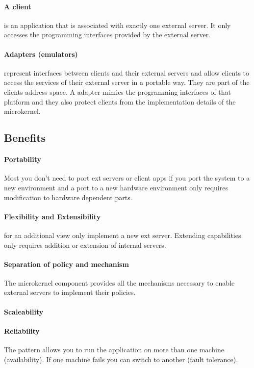 \documentclass[a4paper,11pt,twocolumn]{report}
\begin{document}
    \paragraph{A client} is an application that is associated with exactly one
    external server. It only accesses the programming interfaces provided by
    the external server.
    \paragraph{Adapters (emulators)} represent interfaces between clients and
    their external servers and allow clients to access the services of their
    external server in a portable way. They are part of the clients address
    space. A adapter mimics the programming interfaces of that platform and
    they also protect clients from the implementation details of the
    microkernel.
    \subsection{Benefits}
    \paragraph{Portability} Most you don't need to port ext servers or client
    apps if you port the system to a new environment and a port to a new
    hardware environment only requires modification to hardware dependent
    parts.
    \paragraph{Flexibility and Extensibility} for an additional view only
    implement a new ext server. Extending capabilities only requires addition
    or extension of internal servers.
    \paragraph{Separation of policy and mechanism} The microkernel component
    provides all the mechanisms necessary to enable external servers to
    implement their policies.
    \paragraph{Scaleability}
    \paragraph{Reliability} The pattern allows you to run the application on
    more than one machine (availability). If one machine fails you can switch
    to another (fault tolerance).
\end{document}
